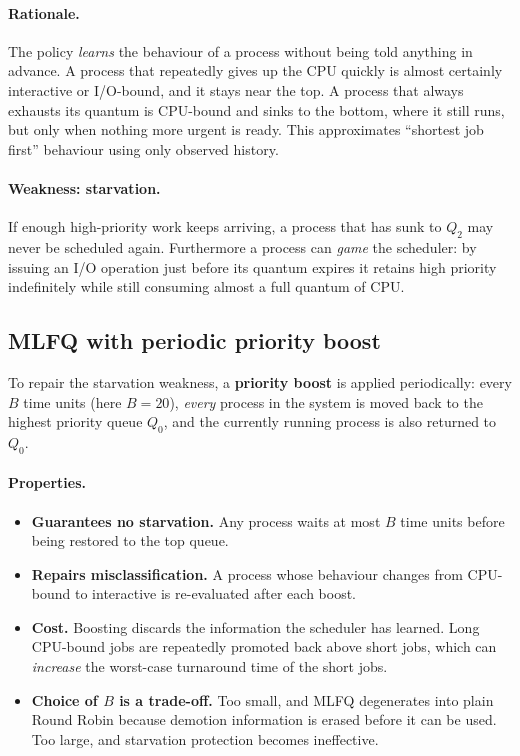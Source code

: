 \documentclass[11pt,a4paper]{article}
\begin{document}
\paragraph{Rationale.} The policy \emph{learns} the behaviour of a process without being
told anything in advance. A process that repeatedly gives up the CPU quickly is almost
certainly interactive or I/O-bound, and it stays near the top. A process that always
exhausts its quantum is CPU-bound and sinks to the bottom, where it still runs, but only
when nothing more urgent is ready. This approximates ``shortest job first'' behaviour using
only observed history.

\paragraph{Weakness: starvation.} If enough high-priority work keeps arriving, a process
that has sunk to $Q_2$ may never be scheduled again. Furthermore a process can
\emph{game} the scheduler: by issuing an I/O operation just before its quantum expires it
retains high priority indefinitely while still consuming almost a full quantum of CPU.

\subsection{MLFQ with periodic priority boost}

To repair the starvation weakness, a \textbf{priority boost} is applied periodically: every
$B$ time units (here $B=20$), \emph{every} process in the system is moved back to the
highest priority queue $Q_0$, and the currently running process is also returned to $Q_0$.

\paragraph{Properties.}
\begin{itemize}\itemsep1pt
  \item \textbf{Guarantees no starvation.} Any process waits at most $B$ time units before
        being restored to the top queue.
  \item \textbf{Repairs misclassification.} A process whose behaviour changes from
        CPU-bound to interactive is re-evaluated after each boost.
  \item \textbf{Cost.} Boosting discards the information the scheduler has learned. Long
        CPU-bound jobs are repeatedly promoted back above short jobs, which can
        \emph{increase} the worst-case turnaround time of the short jobs.
  \item \textbf{Choice of $B$ is a trade-off.} Too small, and MLFQ degenerates into plain
        Round Robin because demotion information is erased before it can be used. Too
        large, and starvation protection becomes ineffective.
\end{itemize}
\end{document}
